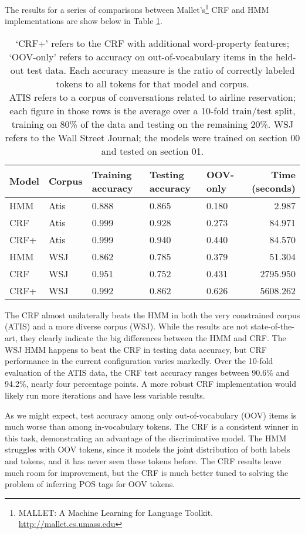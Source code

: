 \documentclass[10pt]{article}\usepackage{graphicx, color}
\begin{document}
The results for a series of comparisons between Mallet's\footnote{MALLET: A Machine Learning for Language Toolkit. \url{http://mallet.cs.umass.edu}} CRF and HMM implementations are show below in Table \ref{table:1}.




\begin{table}[H]
  \centering
  \begin{tabular}{lllllr}
    Model & Corpus & Training accuracy & Testing accuracy & OOV-only & Time (seconds) \\
    \midrule
    HMM   & Atis & 0.888 & 0.865 &
      0.180 & 2.987 \\
    CRF   & Atis & 0.999 & 0.928 &
      0.273 & 84.971 \\
    CRF+ & Atis & 0.999 & 0.940 &
      0.440 & 84.570 \\
    \midrule
    HMM   & WSJ & 0.862 & 0.785 &
      0.379 & 51.304 \\
    CRF   & WSJ & 0.951 & 0.752 &
      0.431 & 2795.950 \\
    CRF+ & WSJ & 0.992 & 0.862 &
      0.626 & 5608.262 \\
  \end{tabular}
  \caption{`CRF+' refers to the CRF with additional word-property features; `OOV-only' refers to accuracy on out-of-vocabulary items in the held-out test data. Each accuracy measure is the ratio of correctly labeled tokens to all tokens for that model and corpus.\\
  ATIS refers to a corpus of conversations related to airline reservation; each figure in those rows is the average over a 10-fold train/test split, training on 80\% of the data and testing on the remaining 20\%. WSJ refers to the Wall Street Journal; the models were trained on section 00 and tested on section 01.}
  \label{table:1}
\end{table}
The CRF almost unilaterally beats the HMM in both the very constrained corpus (ATIS) and a more diverse corpus (WSJ). While the results are not state-of-the-art, they clearly indicate the big differences between the HMM and CRF.
The WSJ HMM happens to beat the CRF in testing data accuracy, but CRF performance in the current configuration varies markedly. Over the 10-fold evaluation of the ATIS data, the CRF test accuracy ranges between 90.6\% and 94.2\%, nearly four percentage points.
A more robust CRF implementation would likely run more iterations and have less variable results.

As we might expect, test accuracy among only out-of-vocabulary (OOV) items is much worse than among in-vocabulary tokens. The CRF is a consistent winner in this task, demonstrating an advantage of the discriminative model. The HMM struggles with OOV tokens, since it models the joint distribution of both labels and tokens, and it has never seen these tokens before. The CRF results leave much room for improvement, but the CRF is much better tuned to solving the problem of inferring POS tags for OOV tokens.
\end{document}
